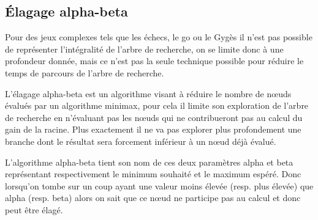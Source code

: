 \subsection{\'Elagage alpha-beta}

		Pour des jeux complexes tels que les échecs, le go ou le Gygès il
		n'est pas possible de représenter l'intégralité de l'arbre de recherche,
		on se limite donc à une profondeur donnée, mais ce n'est pas la seule
		technique possible pour réduire le temps de parcours de l'arbre de recherche.

		\vspace{1em}
		L'élagage alpha-beta est un algorithme visant à réduire le nombre de n\oe{}uds
		évalués par un algorithme minimax, pour cela il limite son exploration de l'arbre de
		recherche en n'évaluant pas les n\oe{}uds qui ne contribueront pas au calcul du gain de
		la racine. Plus exactement il ne va pas explorer plus profondement une branche dont
		le résultat sera forcement inférieur à un n\oe{}ud déjà évalué.
		
		\vspace{1em}
		L'algorithme alpha-beta tient son nom de ces deux paramètres alpha et beta
		représentant respectivement le minimum souhaité et le maximum espéré.
		Donc lorsqu'on tombe sur un coup ayant une valeur moins élevée (resp.
		plus élevée) que alpha (resp. beta) alors on sait que ce n\oe{}ud ne participe
		pas au calcul et donc peut être élagé.


